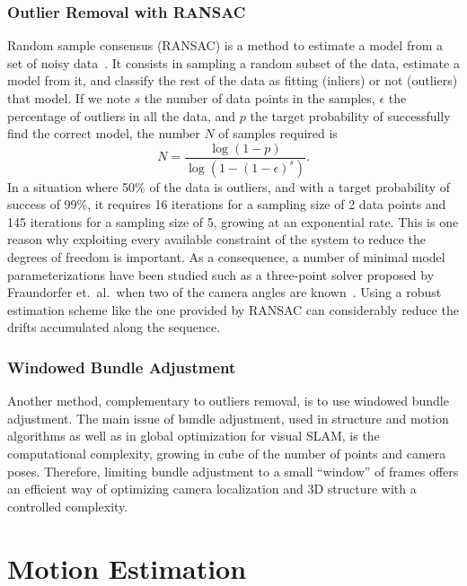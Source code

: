 \subsubsection{Outlier Removal with RANSAC}%
\label{ssub:ransac}

Random sample consensus (RANSAC) is a method to estimate
a model from a set of noisy data~\cite{fischler1981random}.
It consists in sampling a random subset of the data,
estimate a model from it,
and classify the rest of the data as fitting (inliers) or not (outliers) that model.
If we note $s$ the number of data points in the samples,
$\epsilon$ the percentage of outliers in all the data,
and $p$ the target probability of successfully find the correct model,
the number $N$ of samples required is
\[
	N = \frac{\log(1-p)}{\log(1 - (1 - \epsilon)^s)}.
\]
In a situation where 50\% of the data is outliers,
and with a target probability of success of 99\%,
it requires 16 iterations for a sampling size of 2 data points
and 145 iterations for a sampling size of 5,
growing at an exponential rate.
This is one reason why exploiting every available constraint of the system
to reduce the degrees of freedom is important.
As a consequence, a number of minimal model parameterizations
have been studied such as a three-point solver proposed by Fraundorfer et.\ al.\
when two of the camera angles are known~\cite{fraundorfer2010minimal}.
Using a robust estimation scheme like the one provided by RANSAC
can considerably reduce the drifts accumulated along the sequence.


\subsubsection{Windowed Bundle Adjustment}%
\label{ssub:windowed-ba}

Another method, complementary to outliers removal,
is to use windowed bundle adjustment.
The main issue of bundle adjustment, used in structure and motion
algorithms as well as in global optimization for visual SLAM,
is the computational complexity, growing in cube of the number of points
and camera poses.
Therefore, limiting bundle adjustment to a small ``window'' of frames
offers an efficient way of optimizing camera localization and 3D structure
with a controlled complexity.


\section{Motion Estimation}%
\label{sec:motion-estimation}

